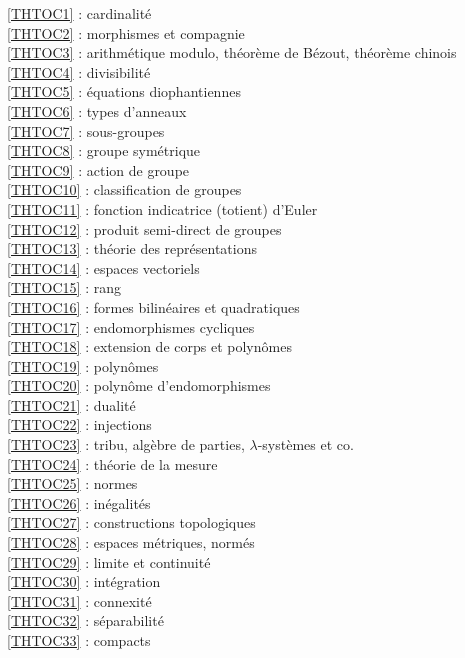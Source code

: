\ref {THTOC1} : cardinalité\\
\ref {THTOC2} : morphismes et compagnie\\
\ref {THTOC3} : arithmétique modulo, théorème de Bézout, théorème chinois\\
\ref {THTOC4} : divisibilité\\
\ref {THTOC5} : équations diophantiennes\\
\ref {THTOC6} : types d'anneaux\\
\ref {THTOC7} : sous-groupes\\
\ref {THTOC8} : groupe symétrique\\
\ref {THTOC9} : action de groupe\\
\ref {THTOC10} : classification de groupes\\
\ref {THTOC11} : fonction indicatrice (totient) d'Euler\\
\ref {THTOC12} : produit semi-direct de groupes\\
\ref {THTOC13} : théorie des représentations\\
\ref {THTOC14} : espaces vectoriels\\
\ref {THTOC15} : rang\\
\ref {THTOC16} : formes bilinéaires et quadratiques\\
\ref {THTOC17} : endomorphismes cycliques\\
\ref {THTOC18} : extension de corps et polynômes\\
\ref {THTOC19} : polynômes\\
\ref {THTOC20} : polynôme d'endomorphismes\\
\ref {THTOC21} : dualité\\
\ref {THTOC22} : injections\\
\ref {THTOC23} : tribu, algèbre de parties, \( \lambda \)-systèmes et co.\\
\ref {THTOC24} : théorie de la mesure\\
\ref {THTOC25} : normes\\
\ref {THTOC26} : inégalités\\
\ref {THTOC27} : constructions topologiques\\
\ref {THTOC28} : espaces métriques, normés\\
\ref {THTOC29} : limite et continuité\\
\ref {THTOC30} : intégration\\
\ref {THTOC31} : connexité\\
\ref {THTOC32} : séparabilité\\
\ref {THTOC33} : compacts\\
